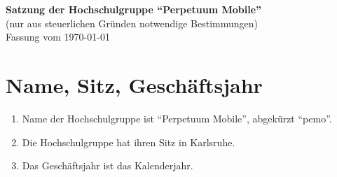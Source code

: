 \documentclass[11pt]{article}
\begin{document}
	\begin{center}
		\Large
		\textbf{
			Satzung der Hochschulgruppe ``Perpetuum Mobile''}\\
		\normalsize
		(nur aus steuerlichen Gründen notwendige Bestimmungen)\\
		\vspace{10mm}
		Fassung vom \today
		\vspace{10mm}
	\end{center}

	\section{Name, Sitz, Geschäftsjahr}
	\begin{enumerate}
		\item Name der Hochschulgruppe ist ``Perpetuum Mobile'', abgekürzt ``pemo''.
		\item Die Hochschulgruppe hat ihren Sitz in Karlsruhe.
		\item Das Geschäftsjahr ist das Kalenderjahr.
	\end{enumerate}
\end{document}
